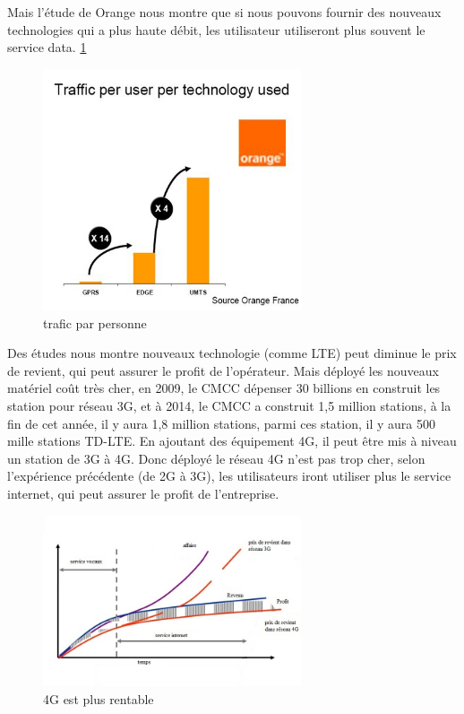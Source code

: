 Mais l'étude de Orange nous montre que si nous pouvons fournir des nouveaux technologies qui a plus haute débit, les utilisateur utiliseront plus souvent le service data.  \ref{traficparpersonne}
  \begin{figure}[H]
   \centering
   \includegraphics[width=3in]{images/orange.JPG}
   \caption{trafic par personne }
   \label{traficparpersonne}
  \end{figure}
 Des études nous montre nouveaux technologie (comme LTE) peut diminue le prix de revient, qui peut assurer le profit de l'opérateur. Mais déployé les nouveaux matériel coût très cher, en 2009, le CMCC dépenser 30 billions \textyen en construit les station pour réseau 3G, et à 2014, le CMCC a construit 1,5 million stations, à la fin de cet année, il y aura 1,8 million stations, parmi ces station, il y aura 500 mille stations TD-LTE. En ajoutant des équipement 4G, il peut être mis à niveau un station de 3G à 4G. Donc déployé le réseau 4G n'est pas trop cher, selon l'expérience précédente (de 2G à 3G), les utilisateurs iront utiliser plus le service internet, qui peut assurer le profit de l'entreprise.
      \begin{figure}[H]
          \centering
          \includegraphics[width=3in]{images/why4G.jpg}
          \caption{4G est plus rentable}
          \label{why4G}
      \end{figure}
      
